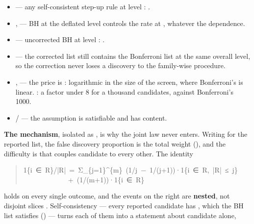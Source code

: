 \begin{itemize}\itemsep1pt \parskip0pt
\item {} --- any self-consistent step-up rule at level
  : .
\item {},  --- BH at the deflated level
   controls the rate at , whatever the dependence.
\item {} --- uncorrected BH at level : .
\item {} --- the corrected list still contains the Bonferroni
  list at the same overall level, so the correction never loses a discovery to
  the family-wise procedure.
\item {},  --- the price is
  : logarithmic in the size of the screen, where
  Bonferroni's is linear. : a factor under 8 for a
  thousand candidates, against Bonferroni's 1000.
\item {} /  --- the assumption is
  satisfiable and has content.
\end{itemize}

\textbf{The mechanism}, isolated as , is why the joint law never enters.
Writing  for the reported list, the false discovery proportion is the
total weight  (), and the difficulty is
that  couples candidate  to every other. The identity

\begin{quote}\ttfamily\footnotesize\begin{flushleft}
1\{i~∈~R\}/|R|~=~Σ\_\{j=1\}\textasciicircum{}\{m\}~(1/j~−~1/(j+1))·1\{i~∈~R,~|R|~≤~j\}\\
~~~~~~~~~~~~~+~(1/(m+1))·1\{i~∈~R\}\\
\end{flushleft}\end{quote}

holds on every single outcome, and the events on the right are \textbf{nested}, not
disjoint slices . Self-consistency --- every reported candidate has
, which the BH list satisfies () --- turns
each of them into a statement about candidate  alone,

